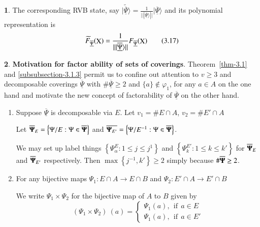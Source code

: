 \documentclass[a4paper,12pt]{article}
\DeclareMathOperator{\x}{\mathrm{X}}
\theoremstyle{definition}
\theoremstyle{underlinethm}
\theoremstyle{definition}
\newtheorem{subsubsec}{}[subsection]
\begin{document}
\begin{subsubsec}
The corresponding RVB state, say $\widetilde{| \underline{\overline{\Psi}} \rangle} = \frac{1}{|| | \underline{\overline{\Psi}} \rangle||} | \underline{\overline{\Psi}} \rangle$ and its polynomial representation is 
\begin{equation*}
\widetilde{F}_{\underline{\overline{\Psi}}} (\bold{\x}) = \frac{1}{|| | \underline{\overline{\Psi}} \rangle||} F_{\underline{\overline{\Psi}}}(\bold{\x})\tag{3.17}
\end{equation*}

\end{subsubsec}

\begin{subsubsec}\label{subsubsection-3.1.5}
{\bf Motivation for factor ability of sets of coverings}. Theorem~\eqref{thm-3.1} and \eqref{subsubsection-3.1.3} permit us to confine out attention to $v\geq 3$ and decomposable coverings $\underline{\overline{\Psi}}$ with $\# \underline{\overline{\Psi}} \geq 2$ and $\{a\} \notin \varphi_{1}$, for any $a \in A$ on the one hand and motivate the new concept of factorability of $\underline{\overline{\Psi}}$ on the other hand.

\begin{enumerate}[label=(\alph*)]
\item Suppose $\underline{\overline{\Psi}}$ is decomposable via $E$. Let $v_{1}= \# E \cap A$, $v_{2} = \# E' \cap A$

Let $\overline{\bold{\Psi}}_{E} = \left\{ \Psi /E : \Psi \in \overline{\bold{\Psi}}\right\}$ and $\overline{\bold{\Psi}_{E'}} = \left\{\Psi/E^{-1}: \Psi \in \overline{\bold{\Psi}}\right\}$.

We may set up label things $\left\{\Psi_{\alpha}^{E} : 1 \leq j \leq j^{1} \right\}$ and $\left\{\Psi_{k}^{E'} : 1 \leq k \leq k'\right\}$ for $\overline{\bold{\Psi}}_{E}$ and $\overline{\bold{\Psi}}_{E'}$ respectively. Then $\max\left\{j^{-1}, k'\right\} \geq 2$ simply because $\# \overline{\bold{\Psi}} \geq 2$. 

\item For any bijective  maps $\Psi_{1} : E \cap A \longrightarrow E \cap B$ and $\Psi_{2} : E' \cap A \longrightarrow E' \cap B$

We write $\Psi_{1} \times \Psi_{2}$ for the bijective map of $A$ to $B$ given by
\[
(\Psi_{1} \times \Psi_{2})~(a) =  
\begin{cases*}
\Psi_{1}(a),~~ \text{if}~~ a\in E\tag{3.18} \\
\Psi_{1}(a),~~ \text{if}~~a \in E' 
\end{cases*}
\]


\end{enumerate}
\end{subsubsec}
\end{document}
